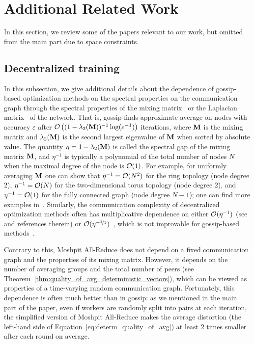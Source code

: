 \section{Additional Related Work}
\label{sect:post_related}

In this section, we review some of the papers relevant to our work, but omitted from the main part due to space constraints. 

\subsection{Decentralized training}\label{sect:post_related_gossip}
In this subsection, we give additional details about the dependence of gossip-based optimization methods on the spectral properties on the communication graph through the spectral properties of the mixing matrix~\cite{xiao2004fast,scaman2019optimal} or the Laplacian matrix~\cite{merris1994laplacian,uribe2020dual} of the network. 
That is, gossip finds approximate average on nodes with accuracy $\varepsilon$ after ${\cal O}\left((1-\lambda_2({\bf M}))^{-1}\log(\varepsilon^{-1})\right)$ iterations, where ${\bf M}$ is the mixing matrix and $\lambda_2({\bf M})$ is the second largest eigenvalue of ${\bf M}$ when sorted by absolute value. 
The quantity $\eta = 1-\lambda_2({\bf M})$ is called the spectral gap of the mixing matrix ${\bf M}$, and $\eta^{-1}$ is typically a polynomial of the total number of nodes $N$ when the maximal degree of the node is ${\cal O}(1)$. For example, for uniformly averaging ${\bf M}$ one can show that $\eta^{-1} = {\cal O}(N^2)$ for the ring topology (node degree $2$), $\eta^{-1} = {\cal O}(N)$ for the two-dimensional torus topology (node degree  $2$), and $\eta^{-1} = {\cal O}(1)$ for the fully connected graph (node degree $N-1$); one can find more examples in~\cite{aldous2002reversible}. Similarly, the communication complexity of decentralized optimization methods often has multiplicative dependence on either ${\cal O}(\eta^{-1})$ (see~\cite{xu2020distributed} and references therein) or ${\cal O}(\eta^{-\nicefrac{1}{2}})$~\cite{scaman2019optimal,uribe2020dual,fallah2019robust,kovalev2020optimal}, which is not improvable for gossip-based methods~\cite{arjevani2015communication,scaman2017optimal}.

Contrary to this, Moshpit All-Reduce does not depend on a fixed communication graph and the properties of its mixing matrix.
However, it depends on the number of averaging groups and the total number of peers (see Theorem~\ref{thm:quality_of_avg_deterministic_vectors}), which can be viewed as properties of a time-varying random communication graph. Fortunately, this dependence is often much better than in gossip: as we mentioned in the main part of the paper, even if workers are randomly split into pairs at each iteration, the simplified version of Moshpit All-Reduce makes the average distortion (the left-hand side of Equation~\ref{eq:determ_quality_of_avg}) at least $2$ times smaller after each round on average.

